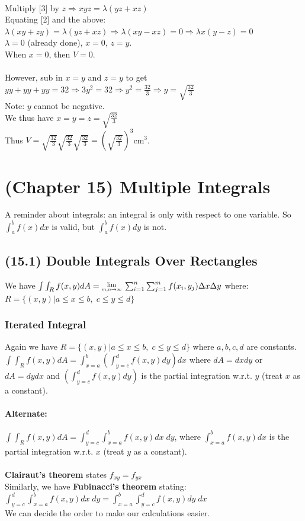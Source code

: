\documentclass{article}
\newcommand{\Lim}[1]{\raisebox{0.5ex}{\scalebox{0.8}{$\displaystyle \lim_{#1}\;$}}}
\newcommand{\Int}[2]{\int_{#1}^{#2}}
\newcommand{\Sum}[2]{\sum_{#1}^{#2}}
\begin{document}
\\Multiply [3] by $z\Rightarrow xyz=\lambda(yz+xz)$
\\Equating [2] and the above: $\lambda(xy+zy)=\lambda(yz+xz)\Rightarrow \lambda(xy-xz)=0\Rightarrow\lambda x(y-z)=0$
\\$\lambda=0$ (already done), $x=0$, $z=y$.
\\When $x=0$, then $V=0$.
\\\\However, sub in $x=y$ and $z=y$ to get $yy+yy+yy=32\Rightarrow 3y^2=32\Rightarrow y^2=\frac{32}{3}\Rightarrow y=\sqrt{\frac{32}{3}}$
\\Note: $y$ cannot be negative.
\\We thus have $x=y=z=\sqrt{\frac{32}{3}}$
\\Thus $V=\sqrt{\frac{32}{3}}\sqrt{\frac{32}{3}}\sqrt{\frac{32}{3}}=(\sqrt{\frac{32}{3}})^3$cm$^3$.

\newpage
\section{(Chapter 15) Multiple Integrals}
A reminder about integrals: an integral is only with respect to one variable.
So $\Int{a}{b}f(x)dx$ is valid, but $\Int{a}{b}f(x)dy$ is not.

\subsection{(15.1) Double Integrals Over Rectangles}
We have \Large$\int\Int{R}{}f(x,y)dA=\Lim{m,n\to\infty}\Sum{i=1}{n}\Sum{j=1}{m}f(x_i,y_j)\Delta x\Delta y$
\normalsize where: \\$R=\{(x,y)|a\leq x\leq b,\;c\leq y\leq d\}$

\subsubsection{Iterated Integral}
Again we have $R=\{(x,y)|a\leq x\leq b,\;c\leq y\leq d\}$ where $a,b,c,d$ are constants.
\\\Large$\int\Int{R}{}f(x,y)dA=\Int{x=a}{b}\left(\Int{y=c}{d}f(x,y)dy\right)dx$ \normalsize where $dA=dxdy$ or $dA=dydx$
and $\left(\Int{y=c}{d}f(x,y)dy\right)$ is the partial integration w.r.t. $y$ (treat $x$ as a constant).

\paragraph{Alternate:} $\int\Int{R}{}f(x,y)dA=\Int{y=c}{d}\Int{x=a}{b}f(x,y)dx\;dy$, where $\Int{x=a}{b}f(x,y)dx$ is the partial integration w.r.t. $x$ (treat $y$ as a constant).
\\\\\textbf{Clairaut's theorem} states $f_{xy}=f_{yx}$
\\Similarly, we have \textbf{Fubinacci's theorem} stating:
$\Int{y=c}{d}\Int{x=a}{b}f(x,y)dx\;dy=\Int{x=a}{b}\Int{y=c}{d}f(x,y)dy\;dx$
\\We can decide the order to make our calculations easier.
\end{document}

